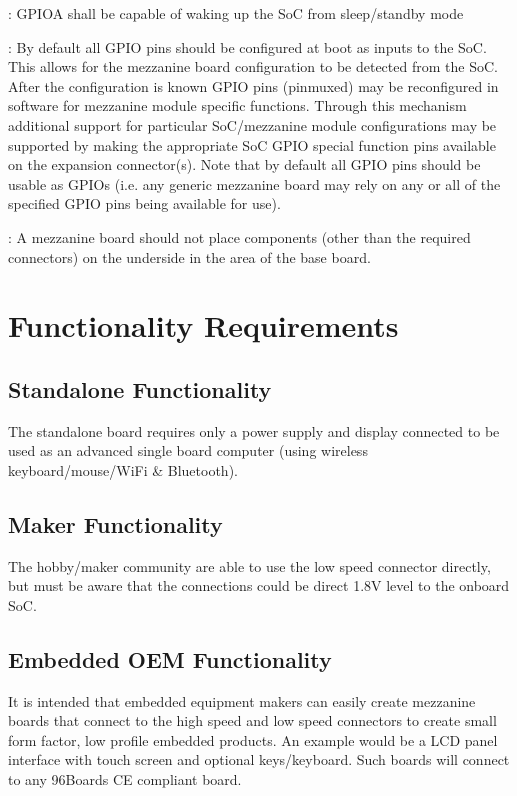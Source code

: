 \documentclass[a4paper,10pt,oneside,english]{sphinxmanual}
\begin{document}
\sphinxAtStartPar
{}

: GPIO\sphinxhyphen{}A shall be capable of waking up the SoC from sleep/standby mode

: By default all GPIO pins should be configured at boot as inputs to the SoC. This allows for the mezzanine board configuration to be detected from the SoC. After the configuration is known GPIO pins (pin\sphinxhyphen{}muxed) may be re\sphinxhyphen{}configured in software for mezzanine module specific functions. Through this mechanism additional support for particular SoC/mezzanine module configurations may be supported by making the appropriate SoC GPIO special function pins available on the expansion connector(s). Note that by default all GPIO pins should be usable as GPIOs (i.e. any generic mezzanine board may rely on any or all of the specified GPIO pins being available for use).

: A mezzanine board should not place components (other than the required connectors) on the underside in the area of the base board.


\chapter{Functionality Requirements}
\label{\detokenize{chapter1-ce:functionality-requirements}}

\section{Standalone Functionality}
\label{\detokenize{chapter1-ce:standalone-functionality}}
\sphinxAtStartPar
The standalone board requires only a power supply and display connected to be used as an advanced single board computer (using wireless keyboard/mouse/WiFi \& Bluetooth).


\section{Maker Functionality}
\label{\detokenize{chapter1-ce:maker-functionality}}
\sphinxAtStartPar
The hobby/maker community are able to use the low speed connector directly, but must be aware that the connections could be direct 1.8V level to the on\sphinxhyphen{}board SoC.


\section{Embedded OEM Functionality}
\label{\detokenize{chapter1-ce:embedded-oem-functionality}}
\sphinxAtStartPar
It is intended that embedded equipment makers can easily create mezzanine boards that connect to the high speed and low speed connectors to create small form factor, low profile embedded products. An example would be a LCD panel interface with touch screen and optional keys/keyboard. Such boards will connect to any 96Boards CE compliant board.
\end{document}
